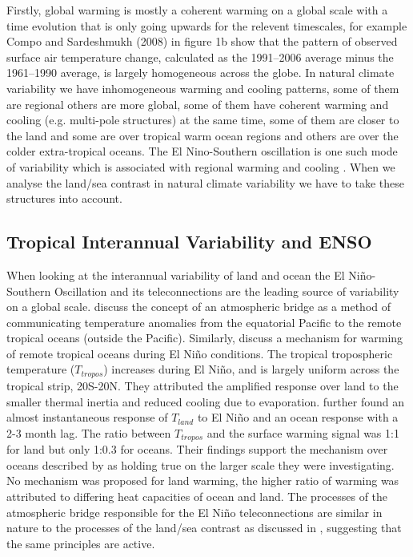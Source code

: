 Firstly, global warming is mostly a coherent warming on a global scale with a 
time evolution that is only going upwards for the relevent timescales, for 
example Compo and Sardeshmukh (2008) in figure 1b show that the pattern of 
observed surface air temperature change, calculated as the 1991--2006 average 
minus the 1961--1990 average, is largely homogeneous across the globe. In 
natural climate variability we have inhomogeneous warming and cooling patterns, 
some of them are regional others are more global, some of them have coherent 
warming and cooling (e.g. multi-pole structures) at the same time, some of them 
are closer to the land and some are over tropical warm ocean regions and others 
are over the colder extra-tropical oceans. The El Nino-Southern oscillation is 
one such mode of variability which is associated with regional warming and 
cooling \citep{Halpert1992}. When we analyse the land/sea contrast in natural 
climate variability we have to take these structures into account.

\subsection{Tropical Interannual Variability and ENSO}

When looking at the interannual variability of land and ocean the El 
Ni{\~n}o-Southern Oscillation and its teleconnections are the leading source of 
variability on a global scale. \citet*{Klein1999} discuss the concept of an 
atmospheric bridge as a method of communicating temperature anomalies from the 
equatorial Pacific to the remote tropical oceans (outside the Pacific).  
Similarly, \citet*{Chiang2002} discuss a mechanism for warming of remote 
tropical oceans during El Ni{\~n}o conditions. The tropical tropospheric 
temperature ($T_{tropos}$) increases during El Ni{\~n}o, and is largely uniform 
across the tropical strip, 20S-20N.  They attributed the amplified response over 
land to the smaller thermal inertia and reduced cooling due to evaporation.  
\citet*{Chiang2005} further found an almost instantaneous response of $T_{land}$ 
to  El Ni{\~n}o and an ocean response with a 2-3 month lag.  The ratio between 
$T_{tropos}$ and the surface warming signal was 1:1 for land but only 1:0.3 for 
oceans.  Their findings support the mechanism over oceans described by 
\citet*{Chiang2002} as holding true on the larger scale they were investigating.  
No mechanism was proposed for land warming, the higher ratio of warming was 
attributed to differing heat capacities of ocean and land. The processes of the 
atmospheric bridge responsible for the El Ni{\~n}o teleconnections are similar 
in nature to the processes of the land/sea contrast as discussed in 
\citet{Joshi2008}, suggesting that the same principles are active.


